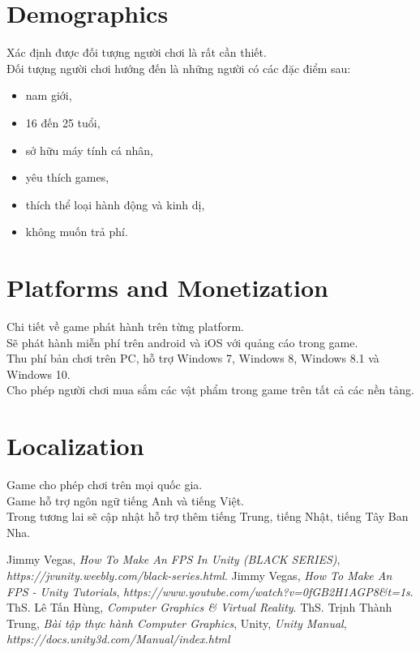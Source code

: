 \documentclass[14pt,a4paper]{extreport}
\begin{document}
\section{Demographics}
Xác định được đối tượng người chơi là rất cần thiết. \\
Đối tượng người chơi hướng đến là những người có các đặc điểm sau:
\begin{itemize}
	\item nam giới,
	\item 16 đến 25 tuổi,
	\item sở hữu máy tính cá nhân,
	\item yêu thích games,
	\item thích thể loại hành động và kinh dị,
	\item không muốn trả phí.
\end{itemize}

\section{Platforms and Monetization}
Chi tiết về game phát hành trên từng platform.\\
Sẽ phát hành miễn phí trên android và iOS với quảng cáo trong game.\\
Thu phí bản chơi trên PC, hỗ trợ Windows 7,  Windows 8, Windows 8.1 và Windows 10.\\
Cho phép người chơi mua sắm các vật phẩm trong game trên tất cả các nền tảng.
\section{Localization}
Game cho phép chơi trên mọi quốc gia.\\
Game hỗ trợ ngôn ngữ tiếng Anh và tiếng Việt.\\
Trong tương lai sẽ cập nhật hỗ trợ thêm tiếng Trung, tiếng Nhật, tiếng Tây Ban Nha.


\begin{thebibliography}{widestlabel}
	 Jimmy Vegas, \textit{How To Make An FPS In Unity
	(BLACK SERIES)}, \textit{https://jvunity.weebly.com/black-series.html}.
	 Jimmy Vegas, \textit{How To Make An FPS - Unity Tutorials}, \textit{https://www.youtube.com/watch?v=0fGB2H1AGP8\&t=1s}.
	 ThS. Lê Tấn Hùng, \textit{Computer Graphics \& Virtual Reality}.
	 ThS. Trịnh Thành Trung, \textit{Bài tập thực hành Computer Graphics}, 
	 Unity, \textit{Unity Manual}, \textit{https://docs.unity3d.com/Manual/index.html}
\end{thebibliography}
\end{document}
